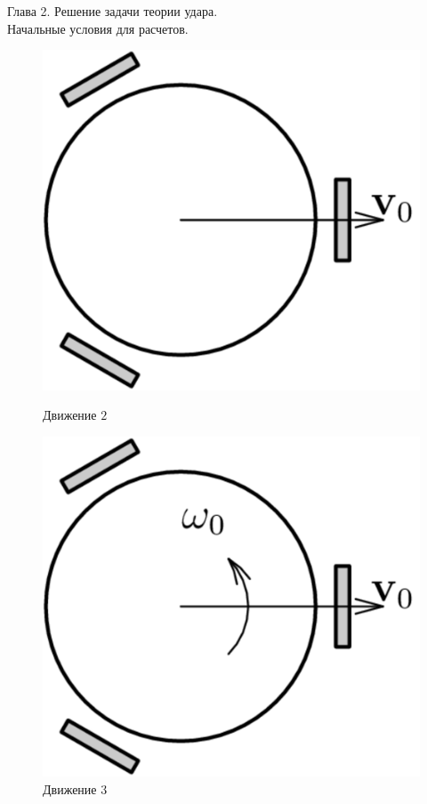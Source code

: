 \begin{myposter}{
    Глава 2. Решение задачи теории удара. \\ Начальные условия для расчетов.
}
{{\begin{figure}[H]
                    \includegraphics[width=\textwidth]{content/pic/asypng/pic_nu_straight.png}
                    \caption{Движение \huge{$2$}}
                \endminipage
                \quad
                    \hspace{60pt}
                    \centering
                    \includegraphics[width=\textwidth]{content/pic/asypng/pic_nu_wrench.png}
                    \caption{Движение \huge{$3$}}
                \endminipage
            \end{figure}
            \vspace{10pt}
        }
    }
    
\end{myposter}
